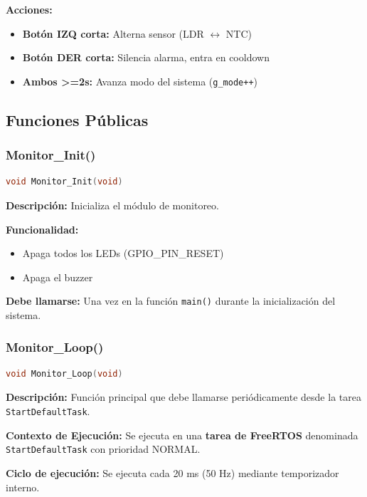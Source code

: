 \documentclass[12pt,a4paper]{article}
\begin{document}
\textbf{Acciones:}
\begin{itemize}
    \item \textbf{Botón IZQ corta:} Alterna sensor (LDR $\leftrightarrow$ NTC)
    \item \textbf{Botón DER corta:} Silencia alarma, entra en cooldown
    \item \textbf{Ambos >=2s:} Avanza modo del sistema (\texttt{g\_mode++})
\end{itemize}

\subsection{Funciones Públicas}

\subsubsection{Monitor\_Init()}
\begin{lstlisting}[language=C, caption=Inicialización del módulo]
void Monitor_Init(void)
\end{lstlisting}

\textbf{Descripción:} Inicializa el módulo de monitoreo.

\textbf{Funcionalidad:}
\begin{itemize}
    \item Apaga todos los LEDs (GPIO\_PIN\_RESET)
    \item Apaga el buzzer
\end{itemize}

\textbf{Debe llamarse:} Una vez en la función \texttt{main()} durante la inicialización del sistema.

\subsubsection{Monitor\_Loop()}
\begin{lstlisting}[language=C, caption=Bucle principal de monitoreo]
void Monitor_Loop(void)
\end{lstlisting}

\textbf{Descripción:} Función principal que debe llamarse periódicamente desde la tarea \texttt{StartDefaultTask}.

\textbf{Contexto de Ejecución:} Se ejecuta en una \textbf{tarea de FreeRTOS} denominada \texttt{StartDefaultTask} con prioridad NORMAL.

\textbf{Ciclo de ejecución:} Se ejecuta cada 20 ms (50 Hz) mediante temporizador interno.
\end{document}
